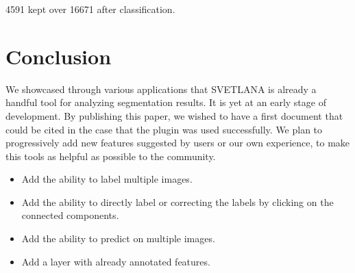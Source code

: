 \documentclass{article}
\begin{document}
4591 kept over 16671 after classification.


\section{Conclusion}
\label{sec:conclusion}

We showcased through various applications that SVETLANA is already a handful tool for analyzing segmentation results. 
It is yet at an early stage of development. By publishing this paper, we wished to have a first document that could be cited in the case that the plugin was used successfully. We plan to progressively add new features suggested by users or our own experience, to make this tools as helpful as possible to the community. 
\begin{itemize}
  \item Add the ability to label multiple images. 
  \item Add the ability to directly label or correcting the labels by clicking on the connected components. 
  \item Add the ability to predict on multiple images. 
  \item Add a layer with already annotated features.
\end{itemize}

\vfill
\pagebreak




\end{document}
